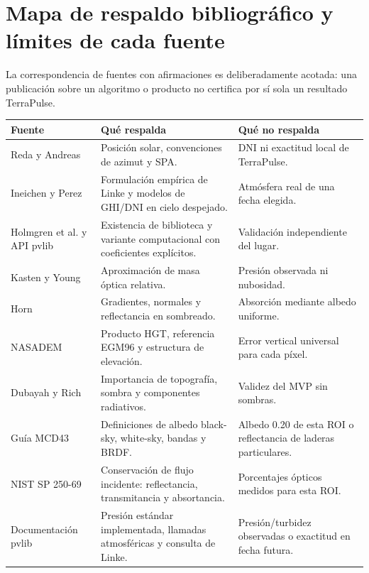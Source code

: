 \documentclass[11pt,a4paper]{article}
\begin{document}
\section{Mapa de respaldo bibliográfico y límites de cada fuente}
La correspondencia de fuentes con afirmaciones es deliberadamente acotada: una publicación sobre un algoritmo o producto no certifica por sí sola un resultado TerraPulse.
\begin{center}\small
\begin{tabular}{p{} p{} p{}}
\toprule
\textbf{Fuente} & \textbf{Qué respalda} & \textbf{Qué no respalda}\\\midrule
Reda y Andreas \cite{reda2004} & Posición solar, convenciones de azimut y SPA. & DNI ni exactitud local de TerraPulse.\\
Ineichen y Perez \cite{ineichen2002} & Formulación empírica de Linke y modelos de GHI/DNI en cielo despejado. & Atmósfera real de una fecha elegida.\\
Holmgren et al. y API pvlib \cite{holmgren2018,pvlibineichen,pvlibsource} & Existencia de biblioteca y variante computacional con coeficientes explícitos. & Validación independiente del lugar.\\
Kasten y Young \cite{kastenyoung1989} & Aproximación de masa óptica relativa. & Presión observada ni nubosidad.\\
Horn \cite{horn1981} & Gradientes, normales y reflectancia en sombreado. & Absorción mediante albedo uniforme.\\
NASADEM \cite{nasadem} & Producto HGT, referencia EGM96 y estructura de elevación. & Error vertical universal para cada píxel.\\
Dubayah y Rich \cite{dubayah1995} & Importancia de topografía, sombra y componentes radiativos. & Validez del MVP sin sombras.\\
Guía MCD43 \cite{modis43} & Definiciones de albedo black-sky, white-sky, bandas y BRDF. & Albedo 0.20 de esta ROI o reflectancia de laderas particulares.\\
NIST SP 250-69 \cite{nisttrans} & Conservación de flujo incidente: reflectancia, transmitancia y absortancia. & Porcentajes ópticos medidos para esta ROI.\\
Documentación pvlib \cite{pvlibalt2pres,pvliblocationsource,pvliblinke} & Presión estándar implementada, llamadas atmosféricas y consulta de Linke. & Presión/turbidez observadas o exactitud en fecha futura.\\
\bottomrule
\end{tabular}
\end{center}
\end{document}
